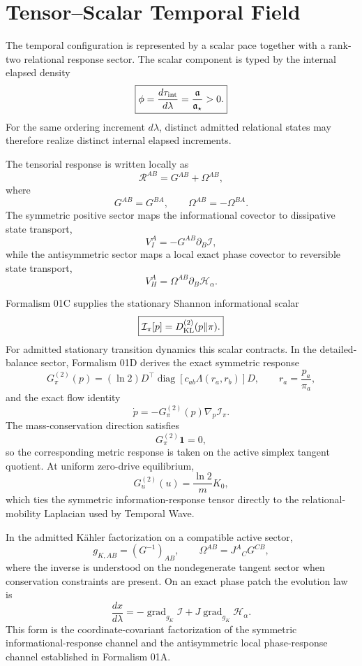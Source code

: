 \documentclass[11pt]{book}
\begin{document}
\chapter{Tensor--Scalar Temporal Field}
The temporal configuration is represented by a scalar pace together with a rank-two relational response sector. The scalar component is typed by the internal elapsed density
\[
\boxed{
\phi
=\frac{d\tau_{\rm int}}{d\lambda}
=\frac{\mathfrak a}{\mathfrak a_\star}>0.
}
\]
For the same ordering increment \(d\lambda\), distinct admitted relational states may therefore realize distinct internal elapsed increments.

The tensorial response is written locally as
\[
\boxed{
\mathcal R^{AB}=G^{AB}+\Omega^{AB},
}
\]
where
\[
G^{AB}=G^{BA},
\qquad
\Omega^{AB}=-\Omega^{BA}.
\]
The symmetric positive sector maps the informational covector to dissipative state transport,
\[
V_I^A=-G^{AB}\partial_B\mathcal I,
\]
while the antisymmetric sector maps a local exact phase covector to reversible state transport,
\[
V_H^A=\Omega^{AB}\partial_B\mathcal H_\alpha.
\]

Formalism 01C supplies the stationary Shannon informational scalar
\[
\boxed{
\mathcal I_\pi[p]=D_{\rm KL}^{(2)}(p\|\pi).
}
\]
For admitted stationary transition dynamics this scalar contracts. In the detailed-balance sector, Formalism 01D derives the exact symmetric response
\[
\boxed{
G^{(2)}_\pi(p)
=(\ln2)D^\top\operatorname{diag}[c_{ab}\Lambda(r_a,r_b)]D,
\qquad
r_a=\frac{p_a}{\pi_a},
}
\]
and the exact flow identity
\[
\boxed{
\dot p=-G^{(2)}_\pi(p)\nabla_p\mathcal I_\pi.
}
\]
The mass-conservation direction satisfies
\[
G^{(2)}_\pi\mathbf1=0,
\]
so the corresponding metric response is taken on the active simplex tangent quotient. At uniform zero-drive equilibrium,
\[
\boxed{
G^{(2)}_u(u)=\frac{\ln2}{m}K_0,
}
\]
which ties the symmetric information-response tensor directly to the relational-mobility Laplacian used by Temporal Wave.

In the admitted Kähler factorization on a compatible active sector,
\[
g_{K,AB}=(G^{-1})_{AB},
\qquad
\Omega^{AB}=J^A{}_{C}G^{CB},
\]
where the inverse is understood on the nondegenerate tangent sector when conservation constraints are present. On an exact phase patch the evolution law is
\[
\boxed{
\frac{dx}{d\lambda}
=-\operatorname{grad}_{g_K}\mathcal I
+J\operatorname{grad}_{g_K}\mathcal H_\alpha.
}
\]
This form is the coordinate-covariant factorization of the symmetric informational-response channel and the antisymmetric local phase-response channel established in Formalism 01A.
\end{document}
